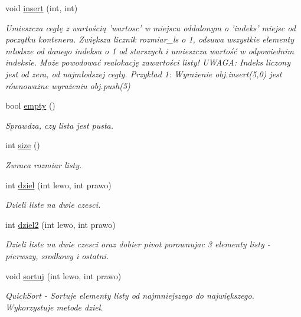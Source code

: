 \begin{DoxyCompactItemize}
void \hyperlink{classarr_1_1_lista_a57365c410ba6ac9d82eb4b4a83bc89bd}{insert} (int, int)
\begin{DoxyCompactList}\small\item\em Umieszcza cegłę z wartością 'wartosc' w miejscu oddalonym o 'indeks' miejsc od początku kontenera. Zwiększa licznik rozmiar\-\_\-ls o 1, odsuwa wszystkie elementy młodsze od danego indeksu o 1 od starszych i umieszcza wartość w odpowiednim indeksie. Może powodować realokację zawartości listy! U\-W\-A\-G\-A\-: Indeks liczony jest od zera, od najmłodszej cegły. Przykład 1\-: Wyrażenie obj.\-insert(5,0) jest równoważne wyrażeniu obj.\-push(5) \end{DoxyCompactList}\item 
bool \hyperlink{classarr_1_1_lista_a6eef5db974ccbb5f133a76d22b375ae9}{empty} ()
\begin{DoxyCompactList}\small\item\em Sprawdza, czy lista jest pusta. \end{DoxyCompactList}\item 
int \hyperlink{classarr_1_1_lista_a853418a2061e80c83185f03f0e1568c6}{size} ()
\begin{DoxyCompactList}\small\item\em Zwraca rozmiar listy. \end{DoxyCompactList}\item 
int \hyperlink{classarr_1_1_lista_a26a9df3345815d473a199e7c1336658b}{dziel} (int lewo, int prawo)
\begin{DoxyCompactList}\small\item\em Dzieli liste na dwie czesci. \end{DoxyCompactList}\item 
int \hyperlink{classarr_1_1_lista_ab255a39afd310f21caf3de6781dcef7a}{dziel2} (int lewo, int prawo)
\begin{DoxyCompactList}\small\item\em Dzieli liste na dwie czesci oraz dobier pivot porownujac 3 elementy listy -\/ pierwszy, srodkowy i ostatni. \end{DoxyCompactList}\item 
void \hyperlink{classarr_1_1_lista_adef9c9c82be06e406ba5305fabf31689}{sortuj} (int lewo, int prawo)
\begin{DoxyCompactList}\small\item\em Quick\-Sort -\/ Sortuje elementy listy od najmniejszego do największego. Wykorzystuje metode dziel. \end{DoxyCompactList}\item 

\end{DoxyCompactItemize}
